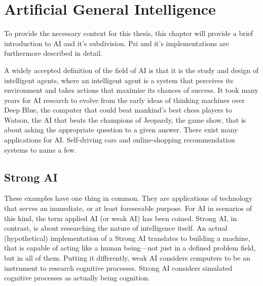 \chapter{Artificial General Intelligence}

To provide the necessary context for this thesis, this chapter will provide a brief introduction to AI and it's subdivision. Psi and it's implementations are furthermore described in detail.

A widely accepted definition of the field of AI is that it is the study and design of intelligent agents, where an intelligent agent is a system that perceives its environment and takes actions that maximise its chances of success. It took many years for AI research to evolve from the early ideas of thinking machines over Deep Blue, the computer that could beat mankind's best chess players to Watson, the AI that beats the champions of Jeopardy, the game show, that is about asking the appropriate question to a given answer. There exist many applications for AI. Self-driving cars and online-shopping recommendation systems to name a few.

\section{Strong AI}

These examples have one thing in common. They are applications of technology that serves an immediate, or at least foreseeable purpose. For AI in scenarios of this kind, the term applied AI (or weak AI) has been coined. Strong AI, in contrast, is about researching the nature of intelligence itself. An actual (hypothetical) implementation of a Strong AI translates to building a machine, that is capable of acting like a human being---not just in a defined problem field, but in all of them. Putting it differently, weak AI considers computers to be an instrument to research cognitive processes. Strong AI considers simulated cognitive processes as actually being cognition.


